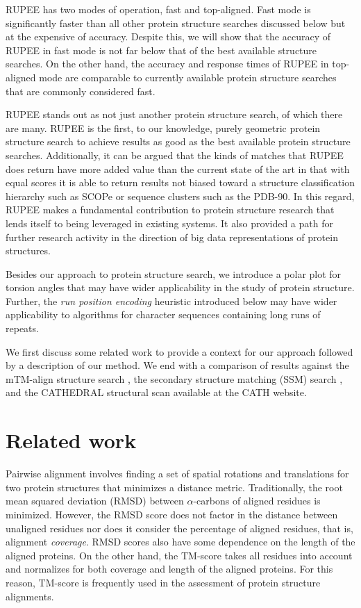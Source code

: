 \documentclass[10pt,letterpaper]{article}
\newcommand{\cas}{$\alpha$-carbons\xspace}
\begin{document}
RUPEE has two modes of operation, fast and top-aligned. 
Fast mode is significantly faster than all other protein structure searches discussed below but at the expensive of accuracy.
Despite this, we will show that the accuracy of RUPEE in fast mode is not far below that of the best available structure searches. 
On the other hand, the accuracy and response times of RUPEE in top-aligned mode are comparable to currently available protein structure searches that are commonly considered fast. 

RUPEE stands out as not just another protein structure search, of which there are many. 
RUPEE is the first, to our knowledge, purely geometric protein structure search to achieve results as good as the best available protein structure searches. 
Additionally, it can be argued that the kinds of matches that RUPEE does return have more added value than the current state of the art in that with equal scores it is able to return results not biased toward a structure classification hierarchy such as SCOPe or sequence clusters such as the PDB-90. 
In this regard, RUPEE makes a fundamental contribution to protein structure research that lends itself to being leveraged in existing systems. 
It also provided a path for further research activity in the direction of big data representations of protein structures. 

Besides our approach to protein structure search, we introduce a polar plot for torsion angles that may have wider applicability in the study of protein structure. 
Further, the \emph{run position encoding} heuristic introduced below may have wider applicability to algorithms for character sequences containing long runs of repeats. 

We first discuss some related work to provide a context for our approach followed by a description of our method. 
We end with a comparison of results against the mTM-align structure search \cite{Dong2018}, the secondary structure matching (SSM) search \cite{Krissinel2004}, and the CATHEDRAL structural scan \cite{Redfern2007} available at the CATH website.

\section*{Related work}

Pairwise alignment involves finding a set of spatial rotations and translations for two protein structures that minimizes a distance metric. 
Traditionally, the root mean squared deviation (RMSD) between \cas of aligned residues is minimized.
However, the RMSD score does not factor in the distance between unaligned residues nor does it consider the percentage of aligned residues, that is, alignment \emph{coverage}. 
RMSD scores also have some dependence on the length of the aligned proteins. 
On the other hand, the TM-score \cite{Zhang2004} takes all residues into account and normalizes for both coverage and length of the aligned proteins. 
For this reason, TM-score is frequently used in the assessment of protein structure alignments. 
\end{document}
